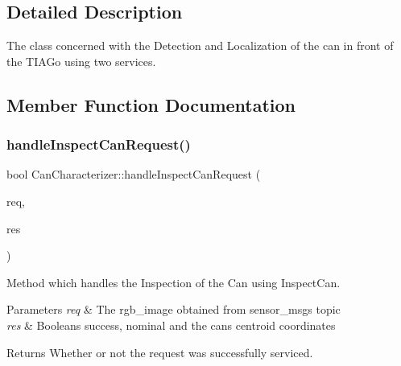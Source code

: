\subsection{Detailed Description}
The class concerned with the Detection and Localization of the can in front of the T\+I\+A\+Go using two services. 

\subsection{Member Function Documentation}
\mbox{\label{classCanCharacterizer_a1c4af17fc5c15849ae895c115f2971f4}} 
\subsubsection{\texorpdfstring{handle\+Inspect\+Can\+Request()}{handleInspectCanRequest()}}
{\footnotesize\ttfamily bool Can\+Characterizer\+::handle\+Inspect\+Can\+Request (\begin{DoxyParamCaption}\item[{enpm808x\+\_\+final\+\_\+inspection\+\_\+robot\+::\+Inspect\+Can\+::\+Inspect\+Can\+::\+Request \&}]{req,  }\item[{enpm808x\+\_\+final\+\_\+inspection\+\_\+robot\+::\+Inspect\+Can\+::\+Inspect\+Can\+::\+Response \&}]{res }\end{DoxyParamCaption})}



Method which handles the Inspection of the Can using Inspect\+Can. 


\begin{DoxyParams}{Parameters}
{\em req} & The rgb\+\_\+image obtained from sensor\+\_\+msgs topic \\
\hline
{\em res} & Booleans success, nominal and the can\textquotesingle{}s centroid coordinates \\
\hline
\end{DoxyParams}
\begin{DoxyReturn}{Returns}
Whether or not the request was successfully serviced. 
\end{DoxyReturn}
\mbox{\label{classCanCharacterizer_a7a0e5c8217a130f3952a476e5cd59bff}} 
